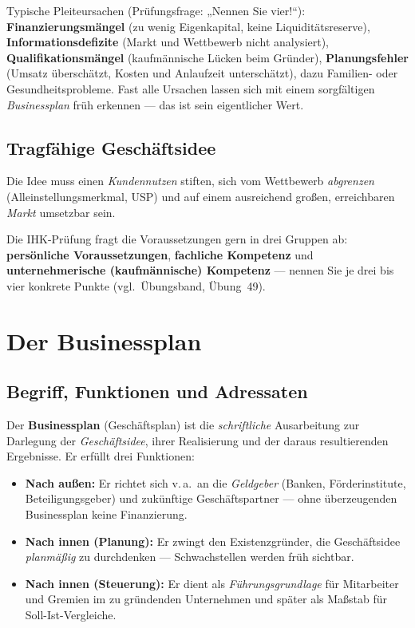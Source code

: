 \documentclass[11pt, a4paper]{article}
\begin{document}
\begin{achtung}[title={\bfseries Warum junge Unternehmen scheitern --- die Klassiker}]
Typische Pleiteursachen (Prüfungsfrage: „Nennen Sie vier!{}``):
\textbf{Finanzierungsmängel} (zu wenig Eigenkapital, keine Liquiditätsreserve),
\textbf{Informationsdefizite} (Markt und Wettbewerb nicht analysiert),
\textbf{Qualifikationsmängel} (kaufmännische Lücken beim Gründer),
\textbf{Planungsfehler} (Umsatz überschätzt, Kosten und Anlaufzeit unterschätzt),
dazu Familien- oder Gesundheitsprobleme. Fast alle Ursachen lassen sich mit einem
sorgfältigen \emph{Businessplan} früh erkennen --- das ist sein eigentlicher Wert.
\end{achtung}

\subsection{Tragfähige Geschäftsidee}

Die Idee muss einen \emph{Kundennutzen} stiften, sich vom Wettbewerb \emph{abgrenzen}
(Alleinstellungsmerkmal, USP) und auf einem ausreichend großen, erreichbaren \emph{Markt}
umsetzbar sein.

\begin{merksatz}
Die IHK-Prüfung fragt die Voraussetzungen gern in drei Gruppen ab: \textbf{persönliche
Voraussetzungen}, \textbf{fachliche Kompetenz} und \textbf{unternehmerische
(kaufmännische) Kompetenz} --- nennen Sie je drei bis vier konkrete Punkte
(vgl.\ Übungsband, Übung~49).
\end{merksatz}

\section{Der Businessplan}

\subsection{Begriff, Funktionen und Adressaten}

Der \textbf{Businessplan} (Geschäftsplan) ist die \emph{schriftliche} Ausarbeitung zur
Darlegung der \emph{Geschäftsidee}, ihrer Realisierung und der daraus resultierenden
Ergebnisse. Er erfüllt drei Funktionen:

\begin{itemize}
  \item \textbf{Nach außen:} Er richtet sich v.\,a.\ an die \emph{Geldgeber} (Banken,
    Förderinstitute, Beteiligungsgeber) und zukünftige Geschäftspartner --- ohne
    überzeugenden Businessplan keine Finanzierung.
  \item \textbf{Nach innen (Planung):} Er zwingt den Existenzgründer, die Geschäftsidee
    \emph{planmäßig} zu durchdenken --- Schwachstellen werden früh sichtbar.
  \item \textbf{Nach innen (Steuerung):} Er dient als \emph{Führungsgrundlage} für
    Mitarbeiter und Gremien im zu gründenden Unternehmen und später als Maßstab für
    Soll-Ist-Vergleiche.
\end{itemize}
\end{document}
